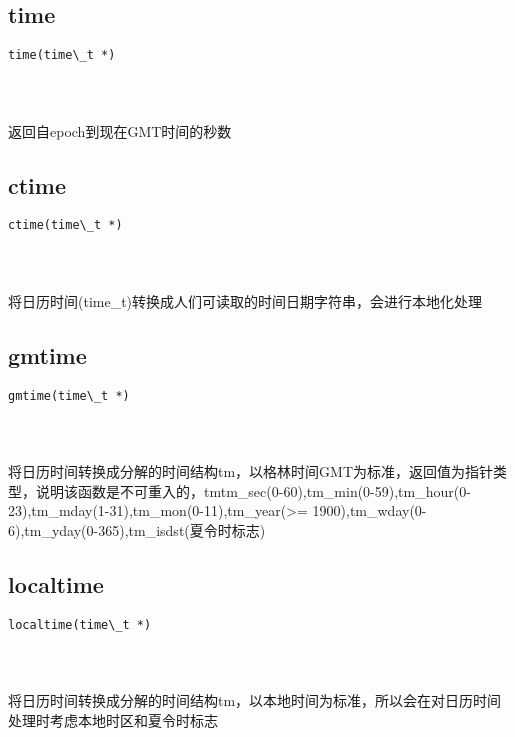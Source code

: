 \documentclass[10pt,a4paper]{article}
\begin{document}
\subsection{time}
\begin{spacing}{2.0}
\lstset{language=C,numbers=none}
\begin{lstlisting}
time(time\_t *)
\end{lstlisting}
{\large\color[rgb]{0.2,0.4,0.6}{*:}}
\paragraph{ \ \ }返回自epoch到现在GMT时间的秒数
\end{spacing}

\subsection{ctime}
\begin{spacing}{2.0}
\lstset{language=C,numbers=none}
\begin{lstlisting}
ctime(time\_t *)
\end{lstlisting}
{\large\color[rgb]{0.2,0.4,0.6}{*:}}
\paragraph{ \ \ }将日历时间(time\_t)转换成人们可读取的时间日期字符串，会进行本地化处理
\end{spacing}

\subsection{gmtime}
\begin{spacing}{2.0}
\lstset{language=C,numbers=none}
\begin{lstlisting}
gmtime(time\_t *)
\end{lstlisting}
{\large\color[rgb]{0.2,0.4,0.6}{*:}}
\paragraph{ \ \ }将日历时间转换成分解的时间结构tm，以格林时间GMT为标准，返回值为指针类型，说明该函数是不可重入的，tm{tm\_sec(0-60),tm\_min(0-59),tm\_hour(0-23),tm\_mday(1-31),tm\_mon(0-11),tm\_year(>= 1900),tm\_wday(0-6),tm\_yday(0-365),tm\_isdst(夏令时标志)}
\end{spacing}

\subsection{localtime}
\begin{spacing}{2.0}
\lstset{language=C,numbers=none}
\begin{lstlisting}
localtime(time\_t *)
\end{lstlisting}
{\large\color[rgb]{0.2,0.4,0.6}{*:}}
\paragraph{ \ \ }将日历时间转换成分解的时间结构tm，以本地时间为标准，所以会在对日历时间处理时考虑本地时区和夏令时标志
\end{spacing}
\end{document}
